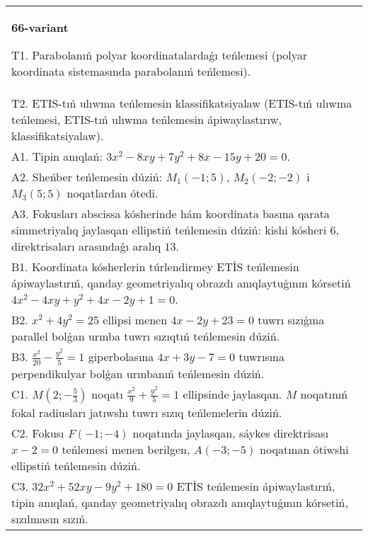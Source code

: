 \documentclass{article}
\begin{document}
\begin{tabular}{m{17cm}}
\textbf{66-variant}
\newline

T1. Parabolanıń polyar koordinatalardaǵı teńlemesi (polyar koordinata sistemasında parabolanıń teńlemesi).\\

T2. ETIS-tıń ulıwma teńlemesin klassifikatsiyalaw (ETIS-tıń ulıwma teńlemesi, ETIS-tıń ulıwma teńlemesin ápiwaylastırıw, klassifikatsiyalaw).\\

A1. Tipin anıqlań: $3 x^{2}-8 xy+7 y^{2}+8 x-15 y+20=0$.\\

A2. Sheńber teńlemesin dúziń: $M_1 (-1;5) $, $M_2 (-2;-2) $ i $M_3 (5;5) $ noqatlardan ótedi.\\

A3. Fokusları abscissa kósherinde hám koordinata basına qarata simmetriyalıq jaylasqan ellipstiń teńlemesin dúziń: kishi kósheri $6$, direktrisaları arasındaǵı aralıq $13$.\\

B1. Koordinata kósherlerin túrlendirmey ETİS teńlemesin ápiwaylastırıń, qanday geometriyalıq obrazdı anıqlaytuǵının kórsetiń $4x^{2} - 4xy + y^{2} + 4x - 2y + 1 = 0$.  \\

B2. $x^{2} + 4y^{2} = 25$ ellipsi menen $4x - 2y + 23 = 0$ tuwrı sızıǵına parallel bolǵan urınba tuwrı sızıqtıń teńlemesin dúziń.  \\

B3. $\frac{x^{2}}{20} - \frac{y^{2}}{5} = 1$ giperbolasına $4x + 3y - 7 = 0$ tuwrısına perpendikulyar bolǵan urınbanıń teńlemesin dúziń.  \\

C1. $M(2; - \frac{5}{3})$ noqatı $\frac{x^{2}}{9} + \frac{y^{2}}{5} = 1$ ellipsinde jaylasqan. $M$ noqatınıń fokal radiusları jatıwshı tuwrı sızıq teńlemelerin dúziń.  \\

C2. Fokusı $F( - 1; - 4)$ noqatında jaylasqan, sáykes direktrisası $x - 2 = 0$ teńlemesi menen berilgen, $A( - 3; - 5)$ noqatınan ótiwshi ellipstiń teńlemesin dúziń.  \\

C3. $32x^{2} + 52xy - 9y^{2} + 180 = 0$ ETİS teńlemesin ápiwaylastırıń, tipin anıqlań, qanday geometriyalıq obrazdı anıqlaytuǵının kórsetiń, sızılmasın sızıń.  \\

\end{tabular}
\vspace{1cm}
\end{document}

